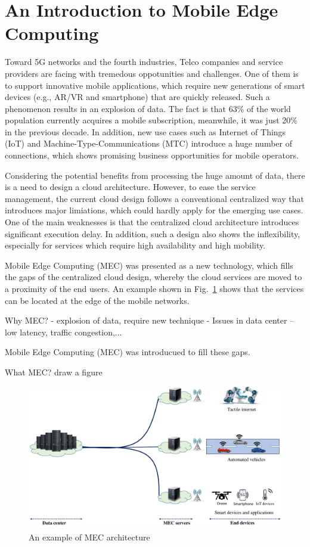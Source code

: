 \section{An Introduction to Mobile Edge Computing}  \label{intro}


Toward 5G networks and the fourth industries, Telco companies and service providers are facing with tremedous oppotunities and challenges. One of them is to support innovative mobile applications, which require new generations of smart devices (e.g., AR/VR and smartphone) that are quickly released. Such a phenomenon results in an explosion of data. The fact is that 63\% of the world population currently acquires a mobile subscription, meanwhile, it was just 20\% in the previous decade. In addition, new use cases such as Internet of Things (IoT) and Machine-Type-Communications (MTC) introduce a huge number of connections, which shows promising business opportunities for mobile operators.

Considering the potential benefits from processing the huge amount of data, there is a need to design a cloud architecture. However, to ease the service management, the current cloud design follows a conventional centralized way that introduces major limiations, which could hardly apply for the emerging use cases. One of the main weaknesses is that the centralized cloud architecture introduces significant execution delay. In addition, such a design also shows the inflexibility, especially for services which require high availability and high mobility. 

Mobile Edge Computing (MEC) was presented as a new technology, which fills the gaps of the centralized cloud design, whereby the cloud services are moved to a proximity of the end users. An example shown  in Fig.~\ref{fig:mec-arch} shows that the services can be located at the edge of the mobile networks. 

Why MEC? 
  - explosion of data, require new technique
  - Issues in data center -- low latency, traffic congestion,...

Mobile Edge Computing (MEC) was introducued to fill these gaps.

What MEC? draw a figure


\begin{figure}[H]
  \begin{center}
   \includegraphics[width=13cm]{./figures/mec-arch.pdf}
   \caption{An example of MEC architecture}
   \label{fig:mec-arch}
   \end{center}
\end{figure}
